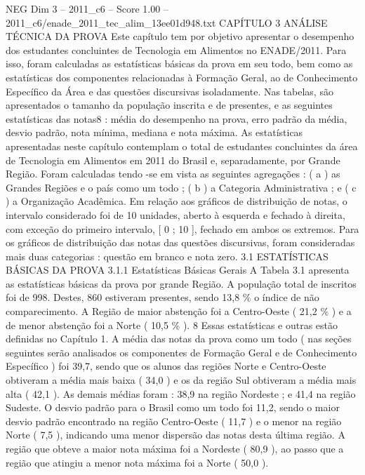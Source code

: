 \begin{textsample}{NEG Dim 3 – 2011\_c6 – Score 1.00 – 2011\_c6/enade\_2011\_tec\_alim\_13ee01d948.txt}  \label{ex:f3_neg_078}
CAPÍTULO 3 ANÁLISE TÉCNICA DA PROVA Este capítulo tem por objetivo apresentar o desempenho dos estudantes concluintes de Tecnologia em Alimentos no ENADE/2011.
Para isso, foram calculadas as estatísticas básicas da prova em seu todo, bem como as estatísticas dos componentes relacionadas à Formação Geral, ao de Conhecimento Específico da Área e das questões discursivas isoladamente.
Nas tabelas, são apresentados o tamanho da população inscrita e de presentes, e as seguintes estatísticas das notas8 : média do desempenho na prova, erro padrão da média, desvio padrão, nota mínima, mediana e nota máxima.
As estatísticas apresentadas neste capítulo contemplam o total de estudantes concluintes da área de Tecnologia em Alimentos em 2011 do Brasil e, separadamente, por Grande Região.
Foram calculadas tendo -se em vista as seguintes agregações : ( a ) as Grandes Regiões e o país como um todo ; ( b ) a Categoria Administrativa ; e ( c ) a Organização Acadêmica.
Em relação aos gráficos de distribuição de notas, o intervalo considerado foi de 10 unidades, aberto à esquerda e fechado à direita, com exceção do primeiro intervalo, [ 0 ; 10 ], fechado em ambos os extremos.
Para os gráficos de distribuição das notas das questões discursivas, foram consideradas mais duas categorias : questão em branco e nota zero. 3.1 ESTATÍSTICAS BÁSICAS DA PROVA 3.1.1 Estatísticas Básicas Gerais A Tabela 3.1 apresenta as estatísticas básicas da prova por grande Região.
A população total de inscritos foi de 998.
Destes, 860 estiveram presentes, sendo 13,8 \% o índice de não comparecimento.
A Região de maior abstenção foi a Centro-Oeste ( 21,2 \% ) e a de menor abstenção foi a Norte ( 10,5 \% ). 8 Essas estatísticas e outras estão definidas no Capítulo 1.
A média das notas da prova como um todo ( nas seções seguintes serão analisados os componentes de Formação Geral e de Conhecimento Específico ) foi 39,7, sendo que os alunos das regiões Norte e Centro-Oeste obtiveram a média mais baixa ( 34,0 ) e os da região Sul obtiveram a média mais alta ( 42,1 ).
As demais médias foram : 38,9 na região Nordeste ; e 41,4 na região Sudeste.
O desvio padrão para o Brasil como um todo foi 11,2, sendo o maior desvio padrão encontrado na região Centro-Oeste ( 11,7 ) e o menor na região Norte ( 7,5 ), indicando uma menor dispersão das notas desta última região.
A região que obteve a maior nota máxima foi a Nordeste ( 80,9 ), ao passo que a região que atingiu a menor nota máxima foi a Norte ( 50,0 ).

\end{textsample}
